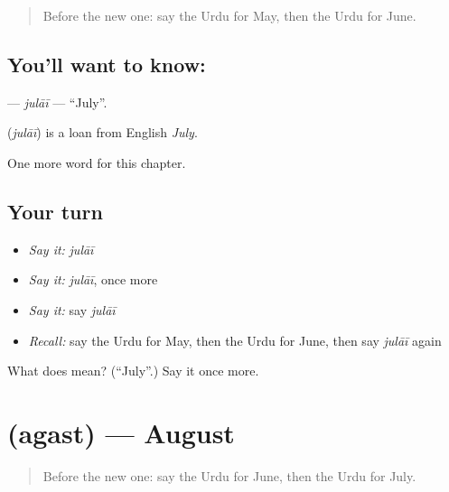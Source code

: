 \label{lesson:UR-C188-julai}



\begin{quote}
Before the new one: say the Urdu for May, then the Urdu for June.
\end{quote}

\subsection*{You'll want to know: }
\textbf{} — \emph{julāī} — \textquotedblleft{}July\textquotedblright{}.

\begin{cousinweb}
\textbf{} (\emph{julāī}) is a loan from English \emph{July}.
\end{cousinweb}

\begin{grammarlens}[title={What you've built}]
One more word for this chapter.
\end{grammarlens}

\subsection*{Your turn}
\begin{itemize}
\raggedright
  \item \emph{Say it:} \emph{julāī}
  \item \emph{Say it:} \emph{julāī}, once more
  \item \emph{Say it:} say \emph{julāī}
  \item \emph{Recall:} say the Urdu for May, then the Urdu for June, then say \emph{julāī} again
\end{itemize}

\begin{tcolorbox}[breakable,colback=teal!4,colframe=teal!35!black,title={Before you move on}]
What does  mean? (\textquotedblleft{}July\textquotedblright{}.) Say it once more.
\end{tcolorbox}
\section[\texorpdfstring{\ur{اگست} (agast)}{اگست (agast)}]{ (agast) — August}

\label{lesson:UR-C188-agast}



\begin{quote}
Before the new one: say the Urdu for June, then the Urdu for July.
\end{quote}

